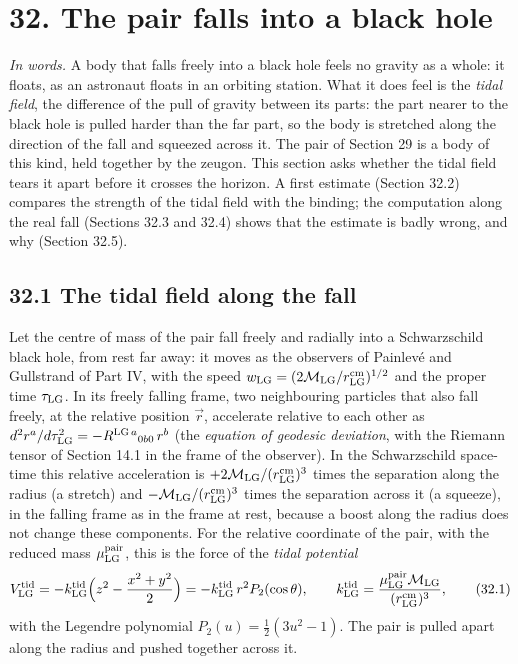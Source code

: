 \documentclass[
  10pt,
]{article}
\begin{document}
\hypertarget{the-pair-falls-into-a-black-hole}{%
\section{32. The pair falls into a black
hole}\label{the-pair-falls-into-a-black-hole}}

\emph{In words.} A body that falls freely into a black hole feels no
gravity as a whole: it floats, as an astronaut floats in an orbiting
station. What it does feel is the \emph{tidal field}, the difference of
the pull of gravity between its parts: the part nearer to the black hole
is pulled harder than the far part, so the body is stretched along the
direction of the fall and squeezed across it. The pair of Section 29 is
a body of this kind, held together by the zeugon. This section asks
whether the tidal field tears it apart before it crosses the horizon. A
first estimate (Section 32.2) compares the strength of the tidal field
with the binding; the computation along the real fall (Sections 32.3 and
32.4) shows that the estimate is badly wrong, and why (Section 32.5).

\hypertarget{the-tidal-field-along-the-fall}{%
\subsection{32.1 The tidal field along the
fall}\label{the-tidal-field-along-the-fall}}

Let the centre of mass of the pair fall freely and radially into a
Schwarzschild black hole, from rest far away: it moves as the observers
of Painlevé and Gullstrand of Part IV, with the speed
\(w_{\rm LG}=(2\mathcal M_{\rm LG}/r^{\rm cm}_{\rm LG})^{1/2}\) and the
proper time \(\tau_{\rm LG}\). In its freely falling frame, two
neighbouring particles that also fall freely, at the relative position
\(\vec r\), accelerate relative to each other as
\(d^2r^a/d\tau_{\rm LG}^2=-R^{{\rm LG}\,a}{}_{0b0}\,r^b\) (the
\emph{equation of geodesic deviation}, with the Riemann tensor of
Section 14.1 in the frame of the observer). In the Schwarzschild
space-time this relative acceleration is
\(+2\mathcal M_{\rm LG}/(r^{\rm cm}_{\rm LG})^3\) times the separation
along the radius (a stretch) and
\(-\mathcal M_{\rm LG}/(r^{\rm cm}_{\rm LG})^3\) times the separation
across it (a squeeze), in the falling frame as in the frame at rest,
because a boost along the radius does not change these components. For
the relative coordinate of the pair, with the reduced mass
\(\mu^{\rm pair}_{\rm LG}\), this is the force of the \emph{tidal
potential}
\[V^{\rm tid}_{\rm LG}=-k^{\rm tid}_{\rm LG}\Big(z^2-\frac{x^2+y^2}2\Big)=-k^{\rm tid}_{\rm LG}\,r^2P_2(\cos\theta),\qquad k^{\rm tid}_{\rm LG}=\frac{\mu^{\rm pair}_{\rm LG}\mathcal M_{\rm LG}}{(r^{\rm cm}_{\rm LG})^3},\tag{32.1}\]
with the Legendre polynomial \(P_2(u)=\tfrac12(3u^2-1)\). The pair is
pulled apart along the radius and pushed together across it.
\end{document}
